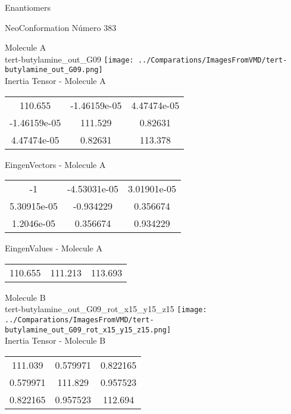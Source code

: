 \begin{center}
\vtab
\vtab
\textcolor{NavyBlue}{\Large Enantiomers}
\end{center}

 \newpage

\vtab[-2cm]
\begin{center}
{\large NeoConformation \tab Número 383}
\end{center}
\begin{multicols}{2}
\begin{center}

Molecule A \\ 
tert-butylamine\_out\_G09
\texttt{[image: ../Comparations/ImagesFromVMD/tert-butylamine\_out\_G09.png]}
\\
Inertia Tensor - Molecule A \\
\vtab

\begin{tabular}{|c c c|}
110.655	 & 	-1.46159e-05	 & 	4.47474e-05	 \\
-1.46159e-05	 & 	111.529	 & 	0.82631	 \\
4.47474e-05	 & 	0.82631	 & 	113.378
\end{tabular}

\vtab
 EingenVectors - Molecule A     \\
\vtab
\begin{tabular}{|c c c|}
-1	 & 	-4.53031e-05	 & 	3.01901e-05	 \\
5.30915e-05	 & 	-0.934229	 & 	0.356674	 \\
1.2046e-05	 & 	0.356674	 & 	0.934229
\end{tabular}

\vtab
 EingenValues - Molecule A     \\
\vtab
\begin{tabular}{|c c c|}
110.655	 & 	111.213	 & 	113.693	 \\
\end{tabular}
\columnbreak

Molecule B \\ 
tert-butylamine\_out\_G09\_rot\_x15\_y15\_z15
\texttt{[image: ../Comparations/ImagesFromVMD/tert-butylamine\_out\_G09\_rot\_x15\_y15\_z15.png]}
\\
Inertia Tensor - Molecule B \\
\vtab

\begin{tabular}{|c c c|}
111.039	 & 	0.579971	 & 	0.822165	 \\
0.579971	 & 	111.829	 & 	0.957523	 \\
0.822165	 & 	0.957523	 & 	112.694
\end{tabular}


\end{center}
\end{multicols}
